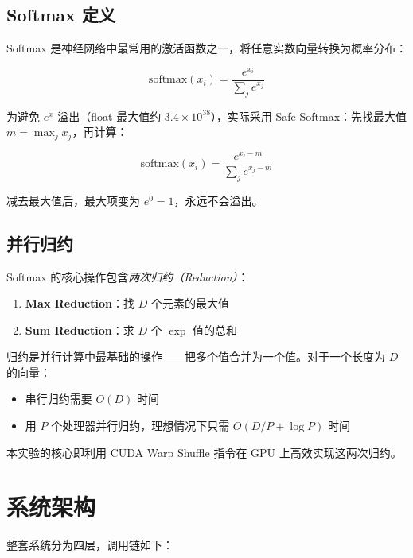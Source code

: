 \documentclass[12pt,a4paper]{ctexart}
\begin{document}
\subsection{Softmax 定义}

Softmax 是神经网络中最常用的激活函数之一，将任意实数向量转换为概率分布：

\begin{equation}
\text{softmax}(x_i) = \frac{e^{x_i}}{\sum_{j} e^{x_j}}
\end{equation}

为避免 $e^{x}$ 溢出（float 最大值约 $3.4 \times 10^{38}$），实际采用 Safe Softmax：先找最大值 $m = \max_j x_j$，再计算：

\begin{equation}
\text{softmax}(x_i) = \frac{e^{x_i - m}}{\sum_j e^{x_j - m}}
\end{equation}

减去最大值后，最大项变为 $e^0 = 1$，永远不会溢出。

\subsection{并行归约}

Softmax 的核心操作包含\emph{两次归约（Reduction）}：

\begin{enumerate}[itemsep=4pt]
    \item \textbf{Max Reduction}：找 $D$ 个元素的最大值
    \item \textbf{Sum Reduction}：求 $D$ 个 $\exp$ 值的总和
\end{enumerate}

归约是并行计算中最基础的操作——把多个值合并为一个值。对于一个长度为 $D$ 的向量：
\begin{itemize}
    \item 串行归约需要 $O(D)$ 时间
    \item 用 $P$ 个处理器并行归约，理想情况下只需 $O(D/P + \log P)$ 时间
\end{itemize}

本实验的核心即利用 CUDA Warp Shuffle 指令在 GPU 上高效实现这两次归约。

\section{系统架构}

整套系统分为四层，调用链如下：
\end{document}
